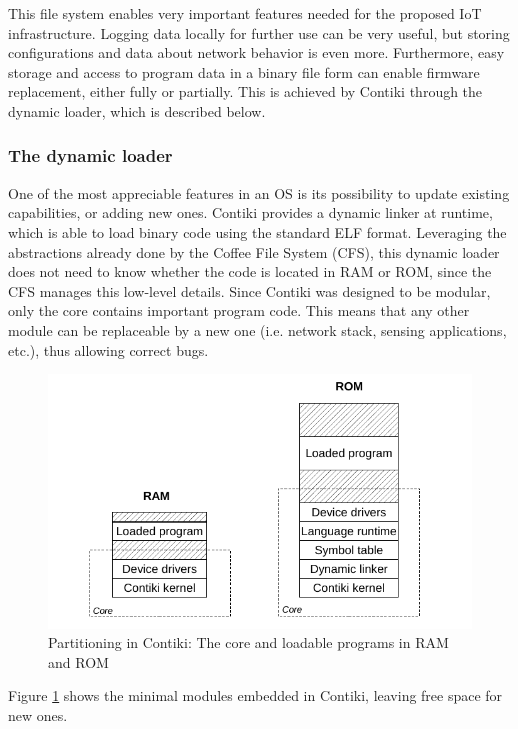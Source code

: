 This file system enables very important features needed for the proposed IoT infrastructure.
Logging data locally for further use can be very useful, but storing configurations and data about network behavior is even more.
Furthermore, easy storage and access to program data in a binary file form can enable firmware replacement, either fully or partially.
This is achieved by Contiki through the dynamic loader, which is described below.

\subsubsection{The dynamic loader}
One of the most appreciable features in an OS is its possibility to update existing capabilities, or adding new ones.
Contiki provides a dynamic linker at runtime, which is able to load binary code using the standard ELF format\cite{tis1995tool}.
Leveraging the abstractions already done by the Coffee File System (CFS), this dynamic loader does not need to know whether the code is located in RAM or ROM, since the CFS manages this low-level details.
Since Contiki was designed to be modular, only the core contains important program code.
This means that any other module can be replaceable by a new one (i.e. network stack, sensing applications, etc.), thus allowing correct bugs.

\begin{figure}[htb]
	\centering
	\includegraphics[width=1\columnwidth]{chapters/background.images/ContikiModules.pdf}
	\caption{Partitioning in Contiki: The core and loadable programs in RAM and ROM\cite{dunkels06runtime}}
	\label{fig:ContikiModules}
\end{figure}

Figure \ref{fig:ContikiModules} shows the minimal modules embedded in Contiki, leaving free space for new ones.


